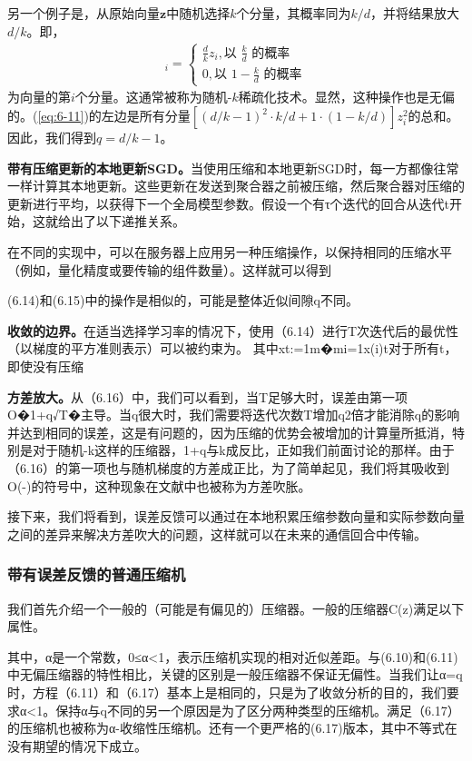 另一个例子是，从原始向量$\bm{z}$中随机选择$k$个分量，其概率同为$k/d$，并将结果放大$d/k$。即，
\begin{align}
	[\mathcal{C}(\bm{z})]_{i} = \left\{ 
	\begin{matrix}
		\frac{d}{k}z_{i}, \text{以 } \frac{k}{d} \text{ 的概率} \\
		0,  \text{以 } 1-\frac{k}{d} \text{ 的概率}
	\end{matrix}
	\right. \label{eq:6-13}
\end{align}
为向量的第$i$个分量。这通常被称为随机-$k$稀疏化技术。显然，这种操作也是无偏的。(\ref{eq:6-11})的左边是所有分量$[(d/k - 1)^{2} \cdot k/d + 1 \cdot (1 - k/d)]z_{i}^{2}$的总和。因此，我们得到$q = d/k - 1$。

\textbf{带有压缩更新的本地更新SGD。}当使用压缩和本地更新SGD时，每一方都像往常一样计算其本地更新。这些更新在发送到聚合器之前被压缩，然后聚合器对压缩的更新进行平均，以获得下一个全局模型参数。假设一个有τ个迭代的回合从迭代t开始，这就给出了以下递推关系。

在不同的实现中，可以在服务器上应用另一种压缩操作，以保持相同的压缩水平（例如，量化精度或要传输的组件数量）。这样就可以得到

(6.14)和(6.15)中的操作是相似的，可能是整体近似间隙q不同。

\textbf{收敛的边界。}在适当选择学习率的情况下，使用（6.14）进行T次迭代后的最优性（以梯度的平方准则表示）可以被约束为。
其中xt:=1m�mi=1x(i)t对于所有t，即使没有压缩

\textbf{方差放大。}从（6.16）中，我们可以看到，当T足够大时，误差由第一项O�1+q√T�主导。当q很大时，我们需要将迭代次数T增加q2倍才能消除q的影响并达到相同的误差，这是有问题的，因为压缩的优势会被增加的计算量所抵消，特别是对于随机-k这样的压缩器，1+q与k成反比，正如我们前面讨论的那样。由于（6.16）的第一项也与随机梯度的方差成正比，为了简单起见，我们将其吸收到O(-)的符号中，这种现象在文献中也被称为方差吹胀。

接下来，我们将看到，误差反馈可以通过在本地积累压缩参数向量和实际参数向量之间的差异来解决方差吹大的问题，这样就可以在未来的通信回合中传输。

\subsubsection{带有误差反馈的普通压缩机}
我们首先介绍一个一般的（可能是有偏见的）压缩器。一般的压缩器C(z)满足以下属性。

其中，α是一个常数，0≤α<1，表示压缩机实现的相对近似差距。与(6.10)和(6.11)中无偏压缩器的特性相比，关键的区别是一般压缩器不保证无偏性。当我们让α=q时，方程（6.11）和（6.17）基本上是相同的，只是为了收敛分析的目的，我们要求α<1。保持α与q不同的另一个原因是为了区分两种类型的压缩机。满足（6.17）的压缩机也被称为α-收缩性压缩机。还有一个更严格的(6.17)版本，其中不等式在没有期望的情况下成立。

